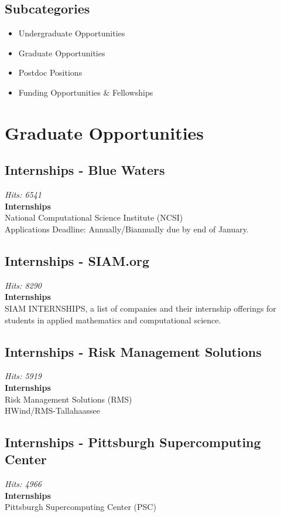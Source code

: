 \documentclass[12pt,a4paper]{article}
\begin{document}
\subsection{Subcategories}
\begin{itemize}
    \item Undergraduate Opportunities
    \item Graduate Opportunities
    \item Postdoc Positions
    \item Funding Opportunities \& Fellowships
\end{itemize}

\section{Graduate Opportunities}

\subsection{Internships - Blue Waters}
\textit{Hits: 6541} \\
\textbf{Internships} \\
National Computational Science Institute (NCSI) \\
Applications Deadline: Annually/Biannually due by end of January.

\subsection{Internships - SIAM.org}
\textit{Hits: 8290} \\
\textbf{Internships} \\
SIAM INTERNSHIPS, a list of companies and their internship offerings for students in applied mathematics and computational science.

\subsection{Internships - Risk Management Solutions}
\textit{Hits: 5919} \\
\textbf{Internships} \\
Risk Management Solutions (RMS) \\
HWind/RMS-Tallahaassee

\subsection{Internships - Pittsburgh Supercomputing Center}
\textit{Hits: 4966} \\
\textbf{Internships} \\
Pittsburgh Supercomputing Center (PSC)
\end{document}
